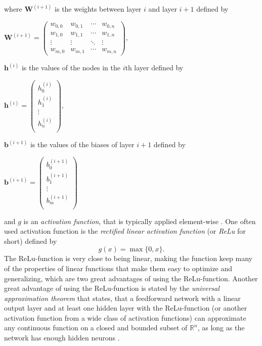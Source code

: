 \documentclass[main.tex]{subfiles}
\begin{document}
where $\bm{W}^{(i + 1)}$ is the weights between layer $i$ and layer $i + 1$ defined by
\begin{center}
    \begin{math}
        \bm{W}^{(i + 1)} =
        \begin{pmatrix}
            w_{0, 0} & w_{0, 1} & \cdots & w_{0, n} \\
            w_{1, 0} & w_{1, 1} & \cdots & w_{1, n} \\
            \vdots & \vdots & \ddots & \vdots \\
            w_{m, 0} & w_{m, 1} & \cdots & w_{m, n}
        \end{pmatrix}
        ,
    \end{math}
\end{center}
$\bm{h}^{(i)}$ is the values of the nodes in the $i$th layer defined by
\begin{center}
    \begin{math}
        \bm{h}^{(i)} =
        \begin{pmatrix}
            h_{0} ^{(i)} \\
            h_{1} ^{(i)} \\
            \vdots \\
            h_{n} ^{(i)} \\
        \end{pmatrix}
        ,
    \end{math}
\end{center}
$\bm{b}^{(i + 1)}$ is the values of the biases of layer $i + 1$ defined by
\begin{center}
    \begin{math}
        \bm{b}^{(i + 1)} =
        \begin{pmatrix}
            b_{0} ^{(i + 1)} \\
            b_{1} ^{(i + 1)} \\
            \vdots \\
            b_{m} ^{(i + 1)} \\
        \end{pmatrix}
    \end{math}
\end{center}
and $g$ is an \textit{activation function}, that is typically applied element-wise \cite{DeepLearning} \cite{3b1b_1}. One often used activation function is the \textit{rectified linear activation function} (or \textit{ReLu} for short) defined by
$$g(x) = \max\{0, x\}.$$
The ReLu-function is very close to being linear, making the function keep many of the properties of linear functions that make them easy to optimize and generalizing, which are two great advantages of using the ReLu-function. Another great advantage of using the ReLu-function is stated by the \textit{universal approximation theorem} that states, that a feedforward network with a linear output layer and at least one hidden layer with the ReLu-function (or another activation function from a wide class of activation functions) can approximate any continuous function on a closed and bounded subset of $\mathbb{R}^n$, as long as the network has enough hidden neurons \cite{DeepLearning}. 
\end{document}
